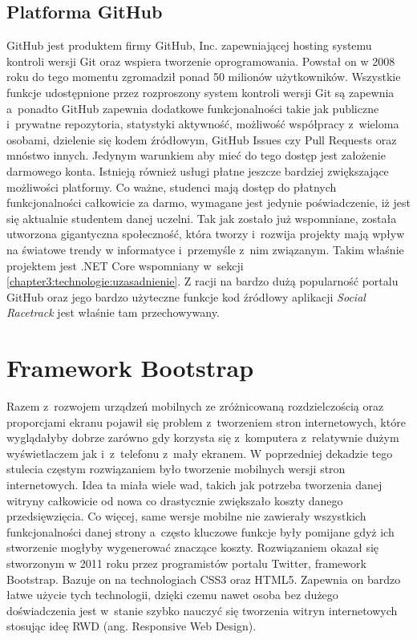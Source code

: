 \documentclass[../Kamil_Kowalewski_Main.tex]{subfiles}
\begin{document}
{{        \subsection{Platforma GitHub}
        \label{chapter3:technologie:github:github} {
            GitHub jest produktem firmy GitHub, Inc. zapewniającej hosting systemu
            kontroli wersji Git oraz wspiera tworzenie oprogramowania. Powstał on w
            2008 roku do tego momentu zgromadził ponad 50 milionów użytkowników.
            Wszystkie funkcje udostępnione przez rozproszony system kontroli wersji Git
            są zapewnia a~ponadto GitHub zapewnia dodatkowe funkcjonalności takie jak
            publiczne i~prywatne repozytoria, statystyki aktywność, możliwość
            współpracy z~wieloma osobami, dzielenie się kodem źródłowym, GitHub Issues
            czy Pull Requests oraz mnóstwo innych. Jedynym warunkiem aby mieć do tego
            dostęp jest założenie darmowego konta. Istnieją również usługi płatne jeszcze
            bardziej zwiększające możliwości platformy. Co ważne, studenci mają dostęp
            do płatnych funkcjonalności całkowicie za darmo, wymagane jest jedynie
            poświadczenie, iż jest się aktualnie studentem danej uczelni. Tak jak zostało
            już wspomniane, została utworzona gigantyczna społeczność, która tworzy
            i~rozwija projekty mają wpływ na światowe trendy w informatyce i~przemyśle
            z~nim związanym. Takim właśnie projektem jest .NET Core wspomniany w~sekcji
            \ref{chapter3:technologie:uzasadnienie}. Z racji na bardzo dużą popularność
            portalu GitHub oraz jego bardzo użyteczne funkcje kod źródłowy aplikacji
            \textit{Social Racetrack} jest właśnie tam przechowywany.
        }
    }

    \section{Framework Bootstrap}
    \label{chapter3:technologie:bootstrap} {
        Razem z~rozwojem urządzeń mobilnych ze zróżnicowaną rozdzielczością oraz
        proporcjami ekranu pojawił się problem z~tworzeniem stron internetowych, które
        wyglądałyby dobrze zarówno gdy korzysta się z~komputera z~relatywnie dużym
        wyświetlaczem jak i~z~telefonu z~mały ekranem. W poprzedniej dekadzie tego stulecia
        częstym rozwiązaniem było tworzenie mobilnych wersji stron internetowych. Idea
        ta miała wiele wad, takich jak potrzeba tworzenia danej
        witryny całkowicie od nowa co drastycznie zwiększało koszty danego
        przedsięwzięcia. Co więcej, same wersje mobilne nie zawierały wszystkich
        funkcjonalności danej strony a~często kluczowe funkcje były pomijane gdyż ich
        stworzenie mogłyby wygenerować znaczące koszty. Rozwiązaniem okazał się stworzonym w 2011
        roku
        przez programistów portalu Twitter, framework Bootstrap\cite{website:bootstrap}. Bazuje
        on na technologiach CSS3 oraz HTML5. Zapewnia on bardzo łatwe użycie tych technologii,
        dzięki czemu nawet osoba bez dużego doświadczenia jest w~stanie szybko nauczyć się
        tworzenia witryn internetowych stosując ideę RWD (ang. Responsive Web Design).

}}
\end{document}
